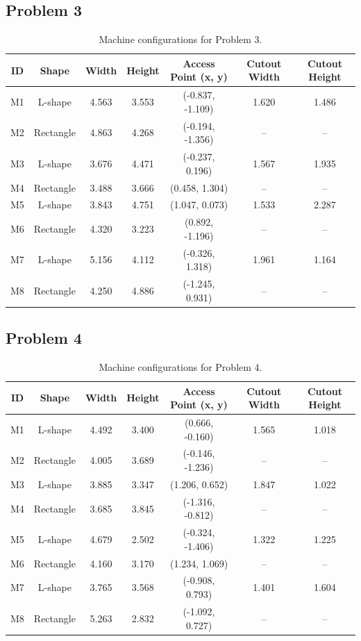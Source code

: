 \subsection{Problem 3}
\begin{table}[H]
\centering
\small
\begin{tabular}{ccccccc}
\toprule
\textbf{ID} & \textbf{Shape} & \textbf{Width} & \textbf{Height} & \textbf{Access Point (x, y)} & \textbf{Cutout Width} & \textbf{Cutout Height} \\
\midrule
M1 & L-shape   & 4.563 & 3.553 & (-0.837, -1.109) & 1.620 & 1.486 \\
M2 & Rectangle & 4.863 & 4.268 & (-0.194, -1.356) & --    & --    \\
M3 & L-shape   & 3.676 & 4.471 & (-0.237, 0.196)  & 1.567 & 1.935 \\
M4 & Rectangle & 3.488 & 3.666 & (0.458, 1.304)   & --    & --    \\
M5 & L-shape   & 3.843 & 4.751 & (1.047, 0.073)   & 1.533 & 2.287 \\
M6 & Rectangle & 4.320 & 3.223 & (0.892, -1.196)  & --    & --    \\
M7 & L-shape   & 5.156 & 4.112 & (-0.326, 1.318)  & 1.961 & 1.164 \\
M8 & Rectangle & 4.250 & 4.886 & (-1.245, 0.931)  & --    & --    \\
\bottomrule
\end{tabular}
\caption{Machine configurations for Problem 3.}
\end{table}

\subsection{Problem 4}
\begin{table}[H]
\centering
\small
\begin{tabular}{ccccccc}
\toprule
\textbf{ID} & \textbf{Shape} & \textbf{Width} & \textbf{Height} & \textbf{Access Point (x, y)} & \textbf{Cutout Width} & \textbf{Cutout Height} \\
\midrule
M1 & L-shape   & 4.492 & 3.400 & (0.666, -0.160)  & 1.565 & 1.018 \\
M2 & Rectangle & 4.005 & 3.689 & (-0.146, -1.236) & --    & --    \\
M3 & L-shape   & 3.885 & 3.347 & (1.206, 0.652)   & 1.847 & 1.022 \\
M4 & Rectangle & 3.685 & 3.845 & (-1.316, -0.812) & --    & --    \\
M5 & L-shape   & 4.679 & 2.502 & (-0.324, -1.406) & 1.322 & 1.225 \\
M6 & Rectangle & 4.160 & 3.170 & (1.234, 1.069)   & --    & --    \\
M7 & L-shape   & 3.765 & 3.568 & (-0.908, 0.793)  & 1.401 & 1.604 \\
M8 & Rectangle & 5.263 & 2.832 & (-1.092, 0.727)  & --    & --    \\
\bottomrule
\end{tabular}
\caption{Machine configurations for Problem 4.}
\end{table}

